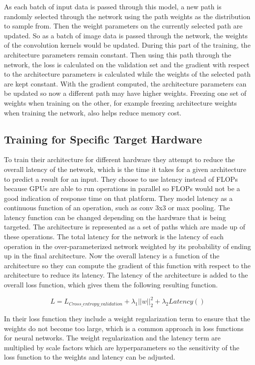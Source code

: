 \documentclass{ieee}
\begin{document}
As each batch of input data is passed through this model, a new path is randomly selected through the network using the path weights as the distribution to sample from. Then the weight parameters on the currently selected path are updated. So as a batch of image data is passed through the network, the weights of the convolution kernels would be updated. During this part of the training, the architecture parameters remain constant. Then using this path through the network, the loss is calculated on the validation set and the gradient with respect to the architecture parameters is calculated while the weights of the selected path are kept constant. With the gradient computed, the architecture parameters can be updated so now a different path may have higher weights. Freezing one set of weights when training on the other, for example freezing architecture weights when training the network, also helps reduce memory cost.

\subsection{Training for Specific Target Hardware}

To train their architecture for different hardware they attempt to reduce the overall latency of the network, which is the time it takes for a given architecture to predict a result for an input. They choose to use latency instead of FLOPs because GPUs are able to run operations in parallel so FLOPs would not be a good indication of response time on that platform. They model latency as a continuous function of an operation, such as conv 3x3 or max pooling. The latency function can be changed depending on the hardware that is being targeted. The architecture is represented as a set of paths which are made up of these operations. The total latency for the network is the latency of each operation in the over-parameterized network weighted by its probability of ending up in the final architecture. Now the overall latency is a function of the architecture so they can compute the gradient of this function with respect to the architecture to reduce its latency. The latency of the architecture is added to the overall loss function, which gives them the following resulting function. 

\begin{equation}
    L = L_{Cross\_entropy\_validation} + \lambda_1 ||w||_2^2 + \lambda_2Latency()
\end{equation}

In their loss function they include a weight regularization term to ensure that the weights do not become too large, which is a common approach in loss functions for neural networks. The weight regularization and the latency term are multiplied by scale factors which are hyperparameters so the sensitivity of the loss function to the weights and latency can be adjusted.
\end{document}
